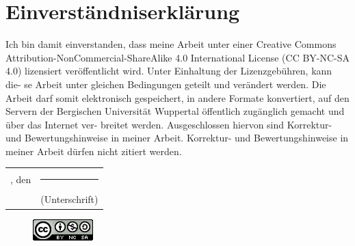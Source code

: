 	\section*{Einverständniserklärung}
	\noindent Ich bin damit einverstanden, dass meine Arbeit unter einer Creative Commons
	Attribution-NonCommercial-ShareAlike 4.0 International License (CC BY-NC-SA
	4.0) lizensiert veröffentlicht wird. Unter Einhaltung der Lizenzgebühren, kann die-
	se Arbeit unter gleichen Bedingungen geteilt und verändert werden. Die Arbeit darf
	somit elektronisch gespeichert, in andere Formate konvertiert, auf den Servern der
	Bergischen Universität Wuppertal öffentlich zugänglich gemacht und über das Internet ver-
	breitet werden. Ausgeschlossen hiervon sind Korrektur- und Bewertungshinweise in meiner Arbeit. Korrektur- und Bewertungshinweise in meiner Arbeit dürfen nicht zitiert werden.
	
	\begin{tabular}{lc}
	\ort, den \abgabedatum \hspace*{1cm}& \rule[-2px]{5cm}{0.5px} \\ 
	                                       &\footnotesize{(Unterschrift)}
	\end{tabular}

	\begin{figure}[h]
		\includegraphics[width=0.2\linewidth]{./Medien/own/cc_by_nc_sa.png}
	\end{figure}

